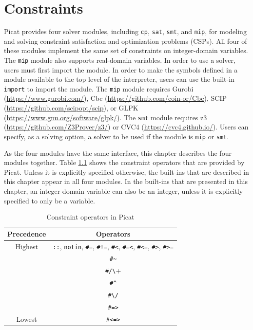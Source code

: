 \chapter{\label{ch:constraints}Constraints}
Picat provides four solver modules, including \texttt{cp}, \texttt{sat}, \texttt{smt}, and \texttt{mip}, for modeling and solving constraint satisfaction and optimization problems (CSPs).  All four of these modules implement the same set of constraints on integer-domain variables. The \texttt{mip} module also supports real-domain variables. In order to use a solver, users must first import the module. In order to make the symbols defined in a module available to the top level of the interpreter, users can use the built-in {\tt import} to import the module. The \texttt{mip} module requires Gurobi (\url{https://www.gurobi.com/}), Cbc (\url{https://github.com/coin-or/Cbc}), SCIP (\url{https://github.com/scipopt/scip}), or GLPK (\url{https://www.gnu.org/software/glpk/}). The \texttt{smt} module requires z3 (\url{https://github.com/Z3Prover/z3/}) or CVC4 (\url{https://cvc4.github.io/}). Users can specify, as a solving option, a solver to be used if the module is \texttt{mip} or \texttt{smt}.

As the four modules have the same interface, this chapter describes the four modules together. Table \ref{tab:cons_ops} shows the constraint operators that are provided by Picat. Unless it is explicitly specified otherwise, the built-ins that are described in this chapter appear in all four modules. In the built-ins that are presented in this chapter, an integer-domain variable can also be an integer, unless it is explicitly specified to only be a variable.

\begin{table}[ht]
\caption{\label{tab:cons_ops}Constraint operators in Picat}
\begin{center}
\begin{tabular}{ |c|c| } \hline
Precedence & Operators  \\ \hline \hline
Highest    & \verb+::+, \verb+notin+,  \verb+#=+,  \verb+#!=+, \verb+#<+,  \verb+#=<+, \verb+#<=+, \verb+#>+, \verb+#>=+ \\ \hline 
           & \verb+#~+ \\ \hline 
           & \verb+#/\+ \\ \hline 
           & \verb+#^+ \\ \hline 
           & \verb+#\/+ \\ \hline 
           & \verb+#=>+ \\ \hline 
Lowest     & \verb+#<=>+ \\ \hline 
\end{tabular}
\end{center}
\end{table}

